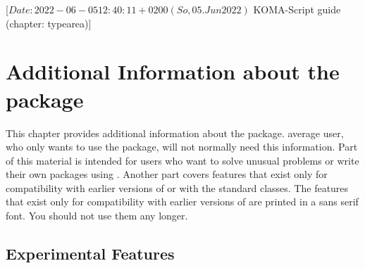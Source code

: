 %
%
%
%
%
%
%

                 [$Date: 2022-06-05 12:40:11 +0200 (So, 05. Jun 2022) $
                  KOMA-Script guide (chapter: typearea)]

\chapter{Additional Information about the  package}
\BeginIndexGroup
{}

This chapter provides additional information about the 
package.  average user, who only wants to use the package, will not
normally need this information. Part of this material is intended for users
who want to solve unusual problems or write their own packages using
. Another part covers  features that exist
only for compatibility with earlier versions of \KOMAScript{} or with the
standard classes. The features that exist only for compatibility with earlier
versions of \KOMAScript{} are printed in a sans serif font. You should not use
them any longer.


\section{Experimental Features}

